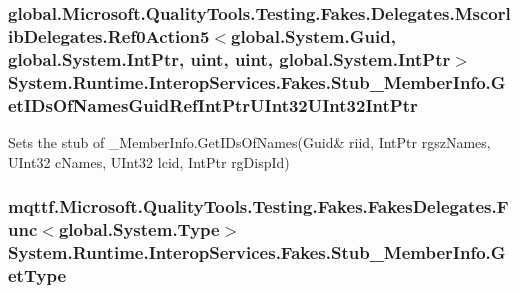 \hypertarget{class_system_1_1_runtime_1_1_interop_services_1_1_fakes_1_1_stub___member_info_ae357857f903996181c388fb4393bea49}{
\subsubsection[{Get\-I\-Ds\-Of\-Names\-Guid\-Ref\-Int\-Ptr\-U\-Int32\-U\-Int32\-Int\-Ptr}]{\setlength{\rightskip}{0pt plus 5cm}global.\-Microsoft.\-Quality\-Tools.\-Testing.\-Fakes.\-Delegates.\-Mscorlib\-Delegates.\-Ref0\-Action5$<$global.\-System.\-Guid, global.\-System.\-Int\-Ptr, uint, uint, global.\-System.\-Int\-Ptr$>$ System.\-Runtime.\-Interop\-Services.\-Fakes.\-Stub\-\_\-\-Member\-Info.\-Get\-I\-Ds\-Of\-Names\-Guid\-Ref\-Int\-Ptr\-U\-Int32\-U\-Int32\-Int\-Ptr}}\label{class_system_1_1_runtime_1_1_interop_services_1_1_fakes_1_1_stub___member_info_ae357857f903996181c388fb4393bea49}


Sets the stub of \-\_\-\-Member\-Info.\-Get\-I\-Ds\-Of\-Names(Guid\& riid, Int\-Ptr rgsz\-Names, U\-Int32 c\-Names, U\-Int32 lcid, Int\-Ptr rg\-Disp\-Id)

\hypertarget{class_system_1_1_runtime_1_1_interop_services_1_1_fakes_1_1_stub___member_info_a8832e2f609701ca0e3138c7767a5a40d}{
\subsubsection[{Get\-Type}]{\setlength{\rightskip}{0pt plus 5cm}mqttf.\-Microsoft.\-Quality\-Tools.\-Testing.\-Fakes.\-Fakes\-Delegates.\-Func$<$global.\-System.\-Type$>$ System.\-Runtime.\-Interop\-Services.\-Fakes.\-Stub\-\_\-\-Member\-Info.\-Get\-Type}}\label{class_system_1_1_runtime_1_1_interop_services_1_1_fakes_1_1_stub___member_info_a8832e2f609701ca0e3138c7767a5a40d}


